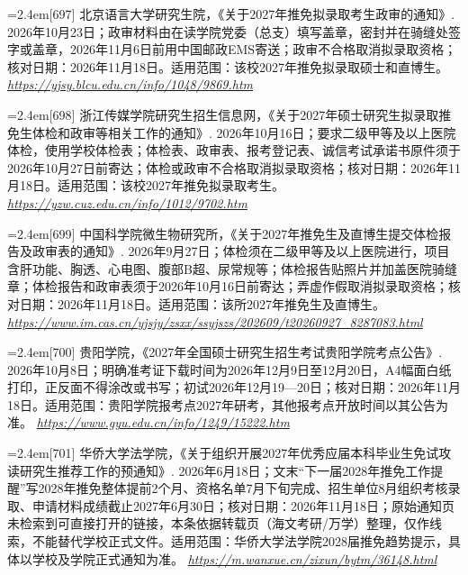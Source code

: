 \par\noindent\hangindent=2.4em\label{src:S0843}{\color{cAccent}[697]} 北京语言大学研究生院，《关于2027年推免拟录取考生政审的通知》. 2026年10月23日；政审材料由在读学院党委（总支）填写盖章，密封并在骑缝处签字或盖章，2026年11月6日前用中国邮政EMS寄送；政审不合格取消拟录取资格；核对日期：2026年11月18日。适用范围：该校2027年推免拟录取硕士和直博生。 \textit{\url{https://yjsy.blcu.edu.cn/info/1048/9869.htm}}\par
\par\noindent\hangindent=2.4em\label{src:S0844}{\color{cAccent}[698]} 浙江传媒学院研究生招生信息网，《关于2027年硕士研究生拟录取推免生体检和政审等相关工作的通知》. 2026年10月16日；要求二级甲等及以上医院体检，使用学校体检表；体检表、政审表、报考登记表、诚信考试承诺书原件须于2026年10月27日前寄达；体检或政审不合格取消拟录取资格；核对日期：2026年11月18日。适用范围：该校2027年推免拟录取考生。 \textit{\url{https://yzw.cuz.edu.cn/info/1012/9702.htm}}\par
\par\noindent\hangindent=2.4em\label{src:S0845}{\color{cAccent}[699]} 中国科学院微生物研究所，《关于2027年推免生及直博生提交体检报告及政审表的通知》. 2026年9月27日；体检须在二级甲等及以上医院进行，项目含肝功能、胸透、心电图、腹部B超、尿常规等；体检报告贴照片并加盖医院骑缝章；体检报告和政审表须于2026年10月16日前寄达；弄虚作假取消拟录取资格；核对日期：2026年11月18日。适用范围：该所2027年推免生及直博生。 \textit{\url{https://www.im.cas.cn/yjsjy/zsxx/ssyjszs/202609/t20260927_8287083.html}}\par
\par\noindent\hangindent=2.4em\label{src:S0846}{\color{cAccent}[700]} 贵阳学院，《2027年全国硕士研究生招生考试贵阳学院考点公告》. 2026年10月8日；明确准考证下载时间为2026年12月9日至12月20日，A4幅面白纸打印，正反面不得涂改或书写；初试2026年12月19—20日；核对日期：2026年11月18日。适用范围：贵阳学院报考点2027年研考，其他报考点开放时间以其公告为准。 \textit{\url{https://www.gyu.edu.cn/info/1249/15222.htm}}\par
\par\noindent\hangindent=2.4em\label{src:S0847}{\color{cAccent}[701]} 华侨大学法学院，《关于组织开展2027年优秀应届本科毕业生免试攻读研究生推荐工作的预通知》. 2026年6月18日；文末“下一届2028年推免工作提醒”写2028年推免整体提前2个月、资格名单7月下旬完成、招生单位8月组织考核录取、申请材料成绩截止2027年6月30日；核对日期：2026年11月18日；原始通知页未检索到可直接打开的链接，本条依据转载页（海文考研/万学）整理，仅作线索，不能替代学校正式文件。适用范围：华侨大学法学院2028届推免趋势提示，具体以学校及学院正式通知为准。 \textit{\url{https://m.wanxue.cn/zixun/bytm/36148.html}}\par
